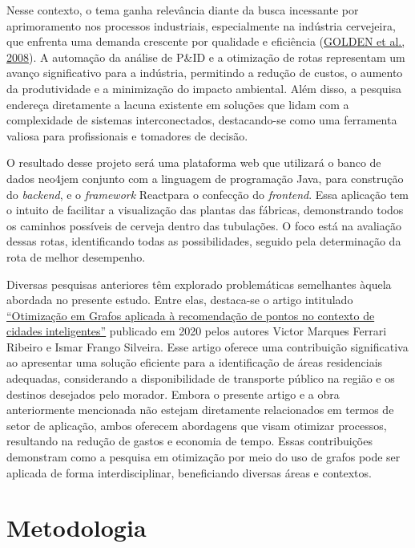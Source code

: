 Nesse contexto, o tema ganha relevância diante da busca incessante por
aprimoramento nos processos industriais, especialmente na indústria
cervejeira, que enfrenta uma demanda crescente por qualidade e
eficiência (\hyperref[referuxeancias-bibliogruxe1ficas]{GOLDEN et al.,
2008}). A automação da análise de P\&ID e a otimização de rotas
representam um avanço significativo para a indústria, permitindo a
redução de custos, o aumento da produtividade e a minimização do impacto
ambiental. Além disso, a pesquisa endereça diretamente a lacuna
existente em soluções que lidam com a complexidade de sistemas
interconectados, destacando-se como uma ferramenta valiosa para
profissionais e tomadores de decisão.

O resultado desse projeto será uma plataforma web que utilizará o banco
de dados neo4j\texttrademark em conjunto com a linguagem de programação
Java\texttrademark, para construção do \emph{backend}, e o
\emph{framework} React\texttrademark para o confecção do
\emph{frontend}. Essa aplicação tem o intuito de facilitar a
visualização das plantas das fábricas, demonstrando todos os caminhos
possíveis de cerveja dentro das tubulações. O foco está na avaliação
dessas rotas, identificando todas as possibilidades, seguido pela
determinação da rota de melhor desempenho.

Diversas pesquisas anteriores têm explorado problemáticas semelhantes
àquela abordada no presente estudo. Entre elas, destaca-se o artigo
intitulado \hyperref[referuxeancias-bibliogruxe1ficas]{``Otimização em
Grafos aplicada à recomendação de pontos no contexto de cidades
inteligentes''} publicado em 2020 pelos autores Victor Marques Ferrari
Ribeiro e Ismar Frango Silveira. Esse artigo oferece uma contribuição
significativa ao apresentar uma solução eficiente para a identificação
de áreas residenciais adequadas, considerando a disponibilidade de
transporte público na região e os destinos desejados pelo morador.
Embora o presente artigo e a obra anteriormente mencionada não estejam
diretamente relacionados em termos de setor de aplicação, ambos oferecem
abordagens que visam otimizar processos, resultando na redução de gastos
e economia de tempo. Essas contribuições demonstram como a pesquisa em
otimização por meio do uso de grafos pode ser aplicada de forma
interdisciplinar, beneficiando diversas áreas e contextos.

\section{Metodologia}\label{metodologia}

